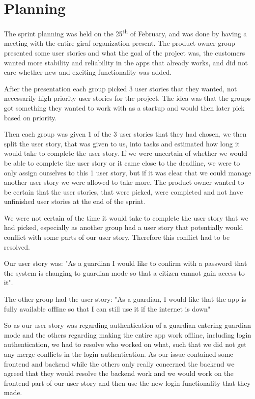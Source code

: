 \section{Planning}
The sprint planning was held on the 25\textsuperscript{th} of February, and was done by having a meeting with the entire giraf organization present. The product owner group presented some user stories and what the goal of the project was, the customers wanted more stability and reliability in the apps that already works, and did not care whether new and exciting functionality was added. 

After the presentation each group picked 3 user stories that they wanted, not necessarily high priority user stories for the project. The idea was that the groups got something they wanted to work with as a startup and would then later pick based on priority.

Then each group was given 1 of the 3 user stories that they had chosen, we then split the user story, that was given to us, into tasks and estimated how long it would take to complete the user story. If we were uncertain of whether we would be able to complete the user story or it came close to the deadline, we were to only assign ourselves to this 1 user story, but if it was clear that we could manage another user story we were allowed to take more. The product owner wanted to be certain that the user stories, that were picked, were completed and not have unfinished user stories at the end of the sprint.

We were not certain of the time it would take to complete the user story that we had picked, especially as another group had a user story that potentially would conflict with some parts of our user story. Therefore this conflict had to be resolved.

Our user story was: "As a guardian I would like to confirm with a password that the system is changing to guardian mode so that a citizen cannot gain access to it".

The other group had the user story: "As a guardian, I would like that the app is fully available offline so that I can still use it if the internet is down"

So as our user story was regarding authentication of a guardian entering guardian mode and the others regarding making the entire app work offline, including login authentication, we had to resolve who worked on what, such that we did not get any merge conflicts in the login authentication. As our issue contained some frontend and backend while the others only really concerned the backend we agreed that they would resolve the backend work and we would work on the frontend part of our user story and then use the new login functionality that they made.

